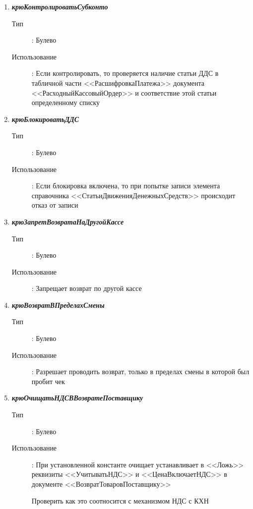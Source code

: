 \begin{enumerate}[label=(\arabic*)]
\vspace{\baselineskip}
\item \textbf{\textit{крюКонтролироватьСубконто}}
\begin{description}
    \item[Тип] : Булево
    \item[Использование]: Если контролировать, то проверяется наличие статьи ДДС в табличной части <<РасшифровкаПлатежа>> документа <<РасходныйКассовыйОрдер>> и соответствие этой статьи определенному списку
\end{description}

\vspace{\baselineskip}
\item \textbf{\textit{крюБлокироватьДДС}}
\begin{description}
    \item[Тип] : Булево
    \item[Использование]: Если блокировка включена, то при попытке записи элемента справочника <<СтатьиДвиженияДенежныхСредств>> происходит отказ от записи
\end{description}


\vspace{\baselineskip}
\item \textbf{\textit{крюЗапретВозвратаНаДругойКассе}}
\begin{description}
    \item[Тип] : Булево
    \item[Использование]: Запрещает возврат по другой кассе
\end{description}


\vspace{\baselineskip}
\item \textbf{\textit{крюВозвратВПределахСмены}}
\begin{description}
    \item[Тип] : Булево
    \item[Использование]: Разрешает проводить возврат, только в пределах смены в которой был пробит чек
\end{description}


\vspace{\baselineskip}
\item \textbf{\textit{крюОчищатьНДСВВозвратеПоставщику}}
\begin{description}
    \item[Тип] : Булево
    \item[Использование]: При установленной константе очищает устанавливает в <<Ложь>> реквизиты <<УчитыватьНДС>> и <<ЦенаВключаетНДС>> в документе <<ВозвратТоваровПоставщику>>
    \begin{myquote}
        Проверить как это соотносится с механизмом НДС с КХН
    \end{myquote}
\end{description}




\end{enumerate}
